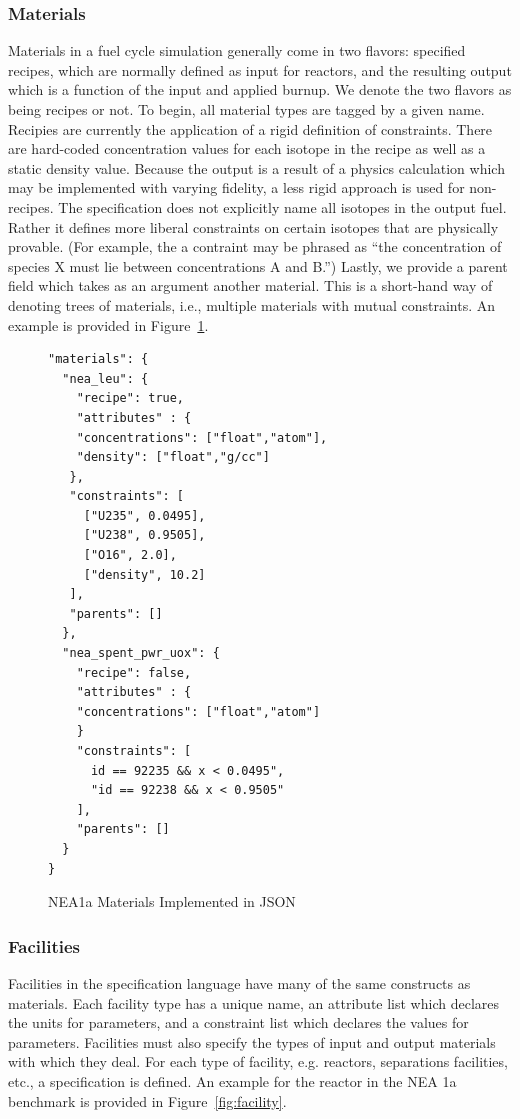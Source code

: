 \documentclass{anstrans}
\begin{document}
\subsubsection{Materials}
Materials in a fuel cycle simulation generally come in two flavors: specified
recipes, which are normally defined as input for reactors, and the resulting
output which is a function of the input and applied burnup. We denote the two
flavors as being recipes or not. To begin, all material types are tagged by a
given name. Recipies are currently the application of a rigid definition of 
constraints. There are hard-coded concentration values for each isotope in the
recipe as well as a static density value. Because the output is a result of a physics
calculation which may be implemented with varying fidelity, a less rigid
approach is used for non-recipes. The specification does not explicitly name all
isotopes in the output fuel. Rather it defines more liberal constraints on certain
isotopes that are physically provable.  (For example, the a contraint may be 
phrased as ``the concentration of species X must lie between concentrations A and 
B.'') Lastly, we provide a parent field which
takes as an argument another material. This is a short-hand way of denoting
trees of materials, i.e., multiple materials with mutual constraints. An example
is provided in Figure~\ref{fig:material}.

\begin{figure}[h!]
\begin{Verbatim}[frame=single]
"materials": {
  "nea_leu": {
    "recipe": true,
    "attributes" : {
    "concentrations": ["float","atom"],
    "density": ["float","g/cc"]
   },
   "constraints": [        
     ["U235", 0.0495],
     ["U238", 0.9505],
     ["O16", 2.0],
     ["density", 10.2]
   ], 
   "parents": []
  },
  "nea_spent_pwr_uox": {
    "recipe": false,
    "attributes" : {
    "concentrations": ["float","atom"]
    }
    "constraints": [
      id == 92235 && x < 0.0495",
      "id == 92238 && x < 0.9505"
    ], 
    "parents": []
  }
}
\end{Verbatim}
\caption{NEA1a Materials Implemented in JSON}
\label{fig:material}
\end{figure}

\subsubsection{Facilities}
Facilities in the specification language have many of the same constructs as
materials. Each facility type has a unique name, an attribute list which
declares the units for parameters, and a constraint list which declares the
values for parameters. Facilities must also specify the types of input and
output materials with which they deal. For each type of facility, e.g. reactors,
separations facilities, etc., a specification is defined. An example for the
reactor in the NEA 1a benchmark is provided in Figure~\ref{fig:facility}.
\end{document}
